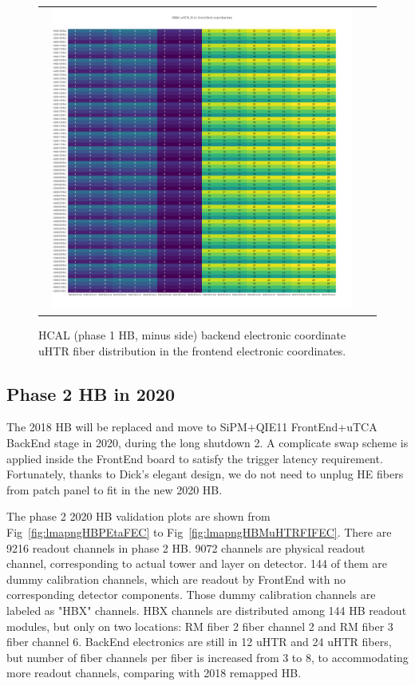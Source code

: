 \begin{figure}[htb]
 \begin{center}
  \begin{tabular}{cc}
   \includegraphics[angle=0,width=0.95\textwidth]{figures/appendix/HBM_uHTR_FI_in_FrontEnd.png}
  \end{tabular}
  \caption{HCAL (phase 1 HB, minus side) backend electronic coordinate uHTR fiber distribution in the frontend electronic coordinates.}
  \label{fig:lmapHBMuHTRFIFEC}
 \end{center}
\end{figure}
\clearpage

\subsection{Phase 2 HB in 2020}
The 2018 HB will be replaced and move to SiPM+QIE11 FrontEnd+uTCA BackEnd stage in 2020, during the long shutdown 2. A complicate swap scheme is applied inside the FrontEnd board to satisfy the trigger latency requirement. Fortunately, thanks to Dick’s elegant design, we do not need to unplug HE fibers from patch panel to fit in the new 2020 HB.

The phase 2 2020 HB validation plots are shown from Fig~\ref{fig:lmapngHBPEtaFEC} to Fig~\ref{fig:lmapngHBMuHTRFIFEC}. There are 9216 readout channels in phase 2 HB. 9072 channels are physical readout channel, corresponding to actual tower and layer on detector. 144 of them are dummy calibration channels, which are readout by FrontEnd with no corresponding detector components. Those dummy calibration channels are labeled as "HBX" channels. HBX channels are distributed among 144 HB readout modules, but only on two locations: RM fiber 2 fiber channel 2 and RM fiber 3 fiber channel 6. BackEnd electronics are still in 12 uHTR and 24 uHTR fibers, but number of fiber channels per fiber is increased from 3 to 8, to accommodating more readout channels, comparing with 2018 remapped HB.
\clearpage

